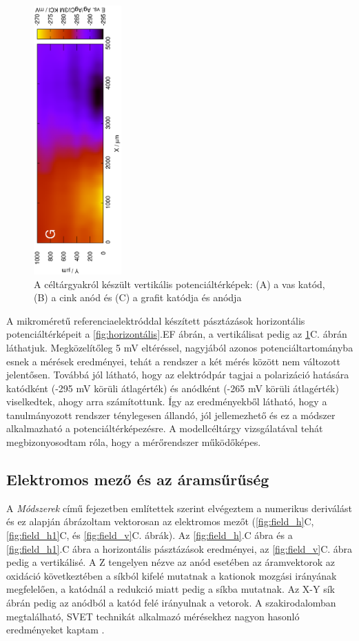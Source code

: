 \begin{figure}
\includegraphics[width=0.3\textwidth, angle=-90]{img/mérések/grafit_v.eps}
\caption{A céltárgyakról készült vertikális potenciáltérképek:
(A) a vas katód, (B) a cink anód és (C) a grafit katódja és anódja}
\label{fig:vertikális}
\end{figure}

A mikroméretű referenciaelektróddal készített pásztázások horizontális potenciáltérképeit a \ref{fig:horizontális}.EF ábrán, a vertikálisat pedig az \ref{fig:vertikális}C. ábrán láthatjuk. Megközelítőleg 5 mV eltéréssel, nagyjából azonos potenciáltartományba esnek a mérések eredményei, tehát a rendszer a két mérés között nem változott jelentősen. Továbbá jól látható, hogy az elektródpár tagjai a polarizáció hatására katódként (-295 mV körüli átlagérték) és anódként (-265 mV körüli átlagérték) viselkedtek, ahogy arra számítottunk. Így az eredményekből látható, hogy a tanulmányozott rendszer ténylegesen állandó, jól jellemezhető és ez a módszer alkalmazható a potenciáltérképezésre. A modellcéltárgy vizsgálatával tehát megbizonyosodtam róla, hogy a mérőrendszer működőképes.

\subsection{Elektromos mező és az áramsűrűség}
A \emph{Módszerek} című fejezetben említettek szerint elvégeztem a numerikus deriválást és ez alapján ábrázoltam vektorosan az elektromos mezőt (\ref{fig:field_h}C,  \ref{fig:field_h1}C, és \ref{fig:field_v}C. ábrák). Az \ref{fig:field_h}.C ábra és a \ref{fig:field_h1}.C ábra a horizontális pásztázások eredményei, az \ref{fig:field_v}C. ábra pedig a vertikálisé. A Z tengelyen nézve az anód esetében az áramvektorok az oxidáció következtében a síkból kifelé mutatnak a kationok mozgási irányának megfelelően, a katódnál a redukció miatt pedig a síkba mutatnak. Az X-Y sík ábrán pedig az anódból a katód felé irányulnak a vetorok. A szakirodalomban megtalálható, SVET technikát alkalmazó mérésekhez nagyon hasonló eredményeket kaptam \cite{bastos2016preliminary}. 

